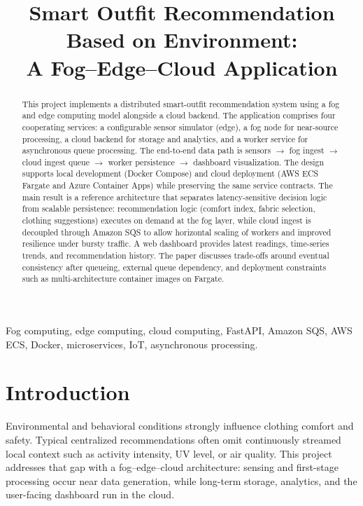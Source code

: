 \documentclass[conference]{IEEEtran}
\title{Smart Outfit Recommendation Based on Environment:\\A Fog--Edge--Cloud Application}
\author{\IEEEauthorblockN{Shubhangi Roy}
\IEEEauthorblockA{\textit{Student ID: x24222127}\\
\textit{Module: Fog \& Edge Computing / Scalable Cloud Programming}\\
\textit{Programme: MSc in Cloud Computing}\\
\textit{National College of Ireland}\\
\textit{Date: 10/04/2026}
}}
\begin{document}
\maketitle

\begin{abstract}
This project implements a distributed smart-outfit recommendation system using a fog and edge computing model alongside a cloud backend. The application comprises four cooperating services: a configurable sensor simulator (edge), a fog node for near-source processing, a cloud backend for storage and analytics, and a worker service for asynchronous queue processing. The end-to-end data path is sensors $\rightarrow$ fog ingest $\rightarrow$ cloud ingest queue $\rightarrow$ worker persistence $\rightarrow$ dashboard visualization. The design supports local development (Docker Compose) and cloud deployment (AWS ECS Fargate and Azure Container Apps) while preserving the same service contracts. The main result is a reference architecture that separates latency-sensitive decision logic from scalable persistence: recommendation logic (comfort index, fabric selection, clothing suggestions) executes on demand at the fog layer, while cloud ingest is decoupled through Amazon SQS to allow horizontal scaling of workers and improved resilience under bursty traffic. A web dashboard provides latest readings, time-series trends, and recommendation history. The paper discusses trade-offs around eventual consistency after queueing, external queue dependency, and deployment constraints such as multi-architecture container images on Fargate.
\end{abstract}

\begin{IEEEkeywords}
Fog computing, edge computing, cloud computing, FastAPI, Amazon SQS, AWS ECS, Docker, microservices, IoT, asynchronous processing.
\end{IEEEkeywords}

\section{Introduction}

Environmental and behavioral conditions strongly influence clothing comfort and safety. Typical centralized recommendations often omit continuously streamed local context such as activity intensity, UV level, or air quality. This project addresses that gap with a fog--edge--cloud architecture: sensing and first-stage processing occur near data generation, while long-term storage, analytics, and the user-facing dashboard run in the cloud.
\end{document}

